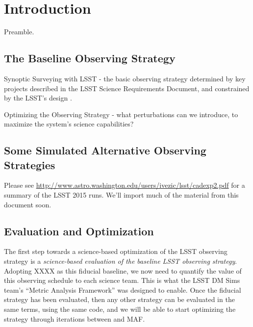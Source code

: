 
\chapter[Introduction]{Introduction}
\label{chp:intro}


Preamble.

\section{The Baseline Observing Strategy}

Synoptic Surveying with LSST - the basic observing strategy determined
by key projects described in the LSST Science Requirements Document,
and constrained by the LSST's design \citep{IvezicEtal2008}.

Optimizing the Observing Strategy - what perturbations can we
introduce, to maximize the system's science capabilities?


\section{Some Simulated Alternative Observing Strategies}


Please see
\url{http://www.astro.washington.edu/users/ivezic/lsst/cadexp2.pdf}
for a summary of the LSST 2015 \OpSim runs. We'll import much of the
material from this document soon.


\section{Evaluation and Optimization}

The first step towards a science-based optimization of the LSST
observing strategy is a {\it science-based evaluation of the baseline
LSST observing strategy}. Adopting XXXX as this fiducial baseline, we
now need to quantify the value of this observing schedule to each
science team. This is what the LSST DM Sims team's ``Metric Analysis
Framework''  was designed to enable. Once the fiducial strategy has
been evaluated, then any other strategy can be evaluated in the same
terms, using the same code, and we will be able to start optimizing
the strategy through iterations between \OpSim and MAF.

